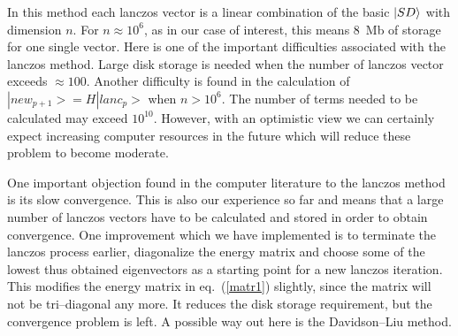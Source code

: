 %
In this method each lanczos vector is a linear combination
of the basic $\left| SD \right\rangle$ with dimension $n$. For
$n \approx 10^6$, as in our case of interest, this means 8~Mb
of storage for one  single vector.
Here is  one of the important difficulties associated
with the lanczos method. Large disk storage is needed when
the number of lanczos vector exceeds $\approx 100$.
Another difficulty is found in the calculation of
$|new_{p+1}> = H |lanc_p>$ when $n > 10^6$.
The number of terms needed to be calculated may exceed
$10^{10}$. However, with an  optimistic view we can
certainly expect increasing computer resources in the future
which will reduce these problem to become moderate.

One important objection found in the computer literature\cite{dav89}
to the lanczos method is its slow convergence. This
is also our experience so far and means
that a large number of lanczos vectors have to be calculated
and stored in order to obtain convergence.
One improvement which we have implemented is to
terminate the lanczos process earlier, diagonalize the energy
matrix and choose some
of the lowest thus obtained eigenvectors as a starting point
for a new lanczos iteration.
This modifies the energy matrix in eq.~(\ref{matr1}) slightly,
since the matrix will not be tri--diagonal any more.
It reduces the disk storage requirement, but the convergence
problem is left. A possible way out here is the Davidson--Liu
method.
%

